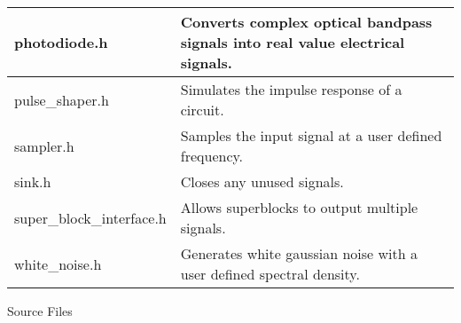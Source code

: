 \begin{table}[H]
\begin{tabulary}{1.0\textwidth}{|L|L|}
photodiode.h               & Converts complex optical bandpass signals into real value electrical signals. \\ \hline
pulse\_shaper.h            & Simulates the impulse response of a circuit.          \\ \hline
sampler.h                  & Samples the input signal at a user defined frequency. \\ \hline
sink.h                     & Closes any unused signals.                           \\ \hline
super\_block\_interface.h  & Allows superblocks to output multiple signals.       \\ \hline
white\_noise.h             & Generates white gaussian noise with a user defined spectral density.\\ \hline
\end{tabulary}
\end{table}		
%
Source Files
